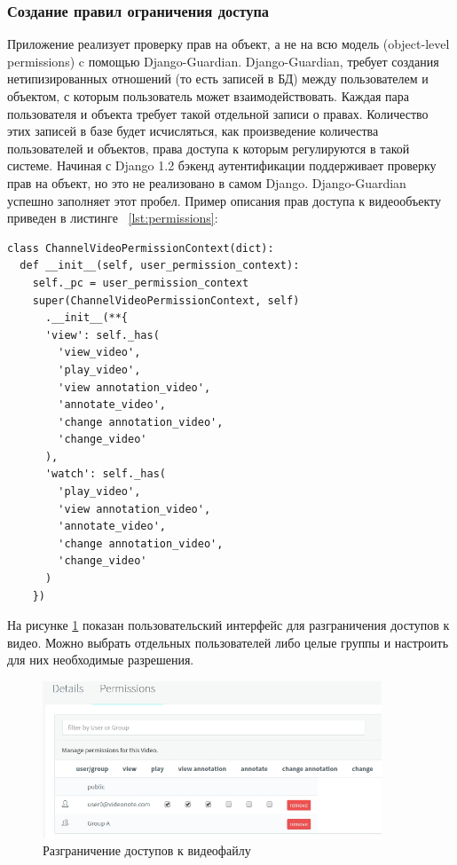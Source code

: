 \subsubsection{Создание правил ограничения доступа}

Приложение реализует проверку прав на объект, а не на всю модель (object-level permissions) c помощью Django-Guardian.
Django-Guardian, требует создания нетипизированных отношений (то есть записей в БД) между пользователем и объектом,
с которым пользователь может взаимодействовать. Каждая пара пользователя и объекта требует такой отдельной записи о правах.
Количество этих записей в базе будет исчисляться, как произведение количества пользователей и объектов,
права доступа к которым регулируются в такой системе.
Начиная с Django 1.2 бэкенд аутентификации поддерживает проверку прав на объект, но это не реализовано в самом Django.
Django-Guardian успешно заполняет этот пробел. Пример описания прав доступа к видеообъекту
приведен в листинге ~\ref{lst:permissions}:

\begin{lstlisting}[caption={Пример описания прав доступа}, label=lst:permissions]
class ChannelVideoPermissionContext(dict):
  def __init__(self, user_permission_context):
    self._pc = user_permission_context
    super(ChannelVideoPermissionContext, self)
      .__init__(**{
      'view': self._has(
        'view_video',
        'play_video',
        'view annotation_video',
        'annotate_video',
        'change annotation_video',
        'change_video'
      ),
      'watch': self._has(
        'play_video',
        'view annotation_video',
        'annotate_video',
        'change annotation_video',
        'change_video'
      )
    })
\end{lstlisting}

На рисунке \ref{permissions} показан пользовательский интерфейс для разграничения доступов к видео. Можно
выбрать отдельных пользователей либо целые группы и настроить для них необходимые разрешения.
\begin{figure}[H]
  \centering
  \includegraphics[width=0.9\textwidth]{images/permissions.jpg}
  \caption{Разграничение доступов к видеофайлу}\label{permissions}
\end{figure}

